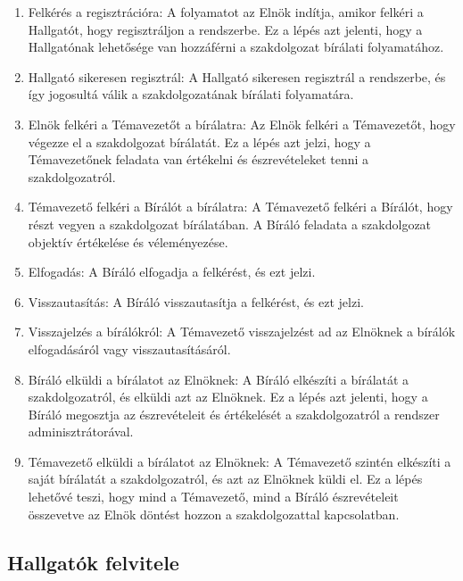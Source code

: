 \documentclass[a4paper,12pt]{article}
\begin{document}
\begin{enumerate}
\item Felkérés a regisztrációra: A folyamatot az Elnök indítja, amikor felkéri a Hallgatót, hogy regisztráljon a rendszerbe. Ez a lépés azt jelenti, hogy a Hallgatónak lehetősége van hozzáférni a szakdolgozat bírálati folyamatához.

\item Hallgató sikeresen regisztrál: A Hallgató sikeresen regisztrál a rendszerbe, és így jogosultá válik a szakdolgozatának bírálati folyamatára.

\item Elnök felkéri a Témavezetőt a bírálatra: Az Elnök felkéri a Témavezetőt, hogy végezze el a szakdolgozat bírálatát. Ez a lépés azt jelzi, hogy a Témavezetőnek feladata van értékelni és észrevételeket tenni a szakdolgozatról.

\item Témavezető felkéri a Bírálót a bírálatra: A Témavezető felkéri a Bírálót, hogy részt vegyen a szakdolgozat bírálatában. A Bíráló feladata a szakdolgozat objektív értékelése és véleményezése.

\item Elfogadás: A Bíráló elfogadja a felkérést, és ezt jelzi.

\item Visszautasítás: A Bíráló visszautasítja a felkérést, és ezt jelzi.

\item Visszajelzés a bírálókról: A Témavezető visszajelzést ad az Elnöknek a bírálók elfogadásáról vagy visszautasításáról.

\item Bíráló elküldi a bírálatot az Elnöknek: A Bíráló elkészíti a bírálatát a szakdolgozatról, és elküldi azt az Elnöknek. Ez a lépés azt jelenti, hogy a Bíráló megosztja az észrevételeit és értékelését a szakdolgozatról a rendszer adminisztrátorával.

\item Témavezető elküldi a bírálatot az Elnöknek: A Témavezető szintén elkészíti a saját bírálatát a szakdolgozatról, és azt az Elnöknek küldi el. Ez a lépés lehetővé teszi, hogy mind a Témavezető, mind a Bíráló észrevételeit összevetve az Elnök döntést hozzon a szakdolgozattal kapcsolatban.
\end{enumerate}

\subsection{Hallgatók felvitele}
\end{document}
